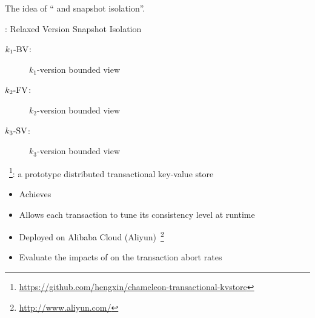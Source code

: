 \begin{frame}{}
  The idea of {\large `` and  snapshot isolation''}.

  \pause
  \vspace{0.50cm}
  \red{\rvsi{}}: Relaxed Version Snapshot Isolation
  \begin{description}
    \item[$k_1\text{-BV}$:] $k_1$-version bounded \emph{} view
    \item[$k_2\text{-FV}$:] $k_2$-version bounded \emph{} view
    \item[$k_3\text{-SV}$:] $k_3$-version bounded \emph{} view
  \end{description}

  \pause
  \vspace{10pt}
  \blue{\chameleon{}}~\footnote{\url{https://github.com/hengxin/chameleon-transactional-kvstore}}: 
  a prototype distributed transactional key-value store
  \begin{itemize}
    \item Achieves \rvsi{}
    \item Allows each transaction to tune its consistency level at runtime
      \pause
    \item Deployed on Alibaba Cloud (Aliyun)~\footnote{\url{http://www.aliyun.com/}}
    \item Evaluate the impacts of \rvsi{} on the transaction abort rates
  \end{itemize}
\end{frame}
